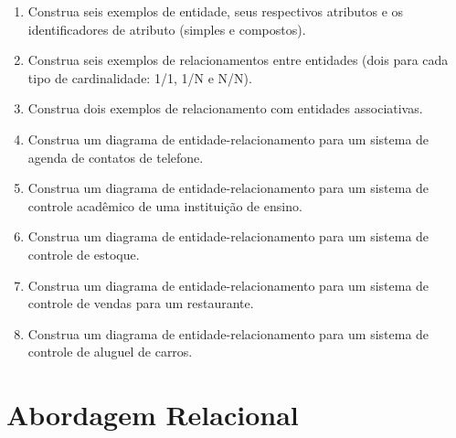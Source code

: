 \documentclass[11pt]{article}
\begin{document}
	\begin{enumerate}
		
		\item Construa seis exemplos de entidade, seus respectivos atributos e os identificadores de atributo (simples e compostos).
		
		\item Construa seis exemplos de relacionamentos entre entidades (dois para cada tipo de cardinalidade: 1/1, 1/N e N/N).
				
		\item Construa dois exemplos de relacionamento com entidades associativas.
		
		\item Construa um diagrama de entidade-relacionamento para um sistema de agenda de contatos de telefone.
		
		\item Construa um diagrama de entidade-relacionamento para um sistema de controle acadêmico de uma
		instituição de ensino.
		
		\item Construa um diagrama de entidade-relacionamento para um sistema de controle de estoque.
		
		\item Construa um diagrama de entidade-relacionamento para um sistema de controle de vendas para um restaurante.
		
		\item Construa um diagrama de entidade-relacionamento para um sistema de controle de aluguel de carros.
	\end{enumerate}
	
	\newpage
	
	\section{Abordagem Relacional}
	
\end{document}
